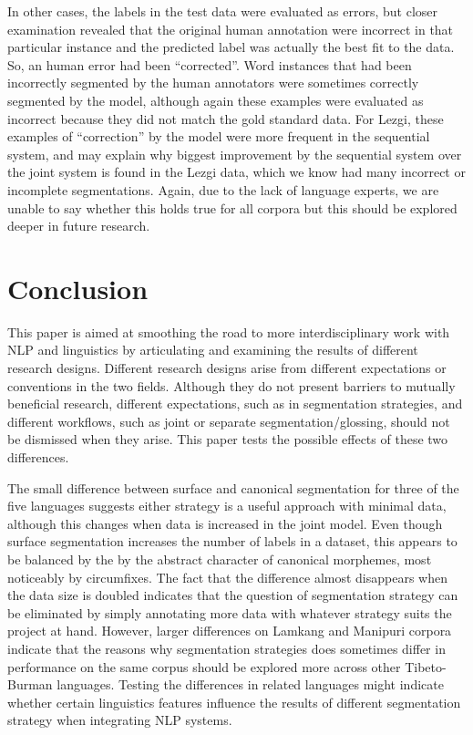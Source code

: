 In other cases, the labels in the test data were evaluated as errors, but closer examination revealed that the original human annotation were incorrect in that particular instance and the predicted label was actually the best fit to the data. So, an human error had been ``corrected''. 
Word instances that had been incorrectly segmented by the human annotators were sometimes correctly segmented by the model, although again these examples were evaluated as incorrect because they did not match the gold standard data. For Lezgi, these examples of ``correction'' by the model were more frequent in the sequential system, and may explain why biggest improvement by the sequential system over the joint system is found in the Lezgi data, which we know had many incorrect or incomplete segmentations.  Again, due to the lack of language experts, we are unable to say whether this holds true for all corpora but this should be explored deeper in future research.


\section{Conclusion}
\label{sec:sgconclusion}

This paper is aimed at smoothing the road to more interdisciplinary work with NLP and linguistics by articulating and examining the results of different research designs. Different research designs arise from different expectations or conventions in the two fields. Although they do not present barriers to mutually beneficial research, different expectations, such as in segmentation strategies, and different workflows, such as joint or separate segmentation/glossing, should not be dismissed when they arise. This paper tests the possible effects of these two differences.

The small difference between surface and canonical segmentation for three of the five languages suggests either strategy is a useful approach with minimal data, although this changes when data is increased in the joint model. Even though surface segmentation increases the number of labels in a dataset, this appears to be balanced by the by the abstract character of canonical morphemes, most noticeably by circumfixes. The fact that the difference almost disappears when the data size is doubled indicates that the question of segmentation strategy can be eliminated by simply annotating more data with whatever strategy suits the project at hand. 
However, larger differences on Lamkang and Manipuri corpora indicate that the reasons why segmentation strategies does sometimes differ in performance on the same corpus should be explored more across other Tibeto-Burman languages. Testing the differences in related languages might indicate whether certain linguistics features influence the results of different segmentation strategy when integrating NLP systems. 

